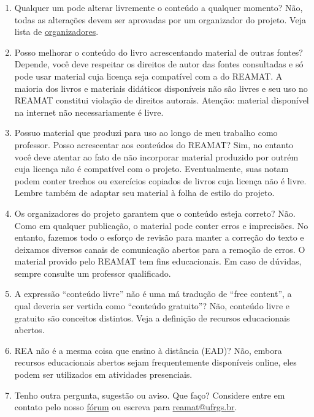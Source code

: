 \documentclass[12pt]{report}
\begin{document}
\begin{enumerate}
\item Qualquer um pode alterar livremente o conteúdo a qualquer momento?
Não, todas as alterações devem ser aprovadas por um organizador do projeto. Veja lista de \href{https://www.ufrgs.br/reamat/organizadores.html}{organizadores}.

\item Posso melhorar o conteúdo do livro acrescentando material de outras fontes?
Depende, você deve respeitar os direitos de autor das fontes consultadas e só pode usar material cuja licença seja compatível com a do REAMAT. A maioria dos livros e materiais didáticos disponíveis não são livres e seu uso no REAMAT constitui violação de direitos autorais. Atenção: material disponível na internet não necessariamente é livre.

\item Possuo material que produzi para uso ao longo de meu trabalho como professor. Posso acrescentar aos conteúdos do REAMAT?
Sim, no entanto você deve atentar ao fato de não incorporar material produzido por outrém cuja licença não é compatível com o projeto. Eventualmente, suas notam podem conter trechos ou exercícios copiados de livros cuja licença não é livre. Lembre também de adaptar seu material à folha de estilo do projeto.

\item Os organizadores do projeto garantem que o conteúdo esteja correto?
Não. Como em qualquer publicação, o material pode conter erros e imprecisões. No entanto, fazemos todo o esforço de revisão para manter a correção do texto e deixamos diversos canais de comunicação abertos para a remoção de erros. O material provido pelo REAMAT tem fins educacionais. Em caso de dúvidas, sempre consulte um professor qualificado.

\item A expressão ``conteúdo livre'' não é uma má tradução de ``free content'', a qual deveria ser vertida como ``conteúdo gratuito''?
Não, conteúdo livre e gratuito são conceitos distintos. Veja a definição de recursos educacionais abertos.

\item REA não é a mesma coisa que ensino à distância (EAD)?
Não, embora recursos educacionais abertos sejam frequentemente disponíveis online, eles podem ser utilizados em atividades presenciais.

\item Tenho outra pergunta, sugestão ou aviso. Que faço?
Considere entre em contato pelo nosso \href{https://www.ufrgs.br/reamat/forum.html}{fórum} ou escreva para \href{mailto:reamat@ufrgs.br}{reamat@ufrgs.br}.
\end{enumerate}
\end{document}
